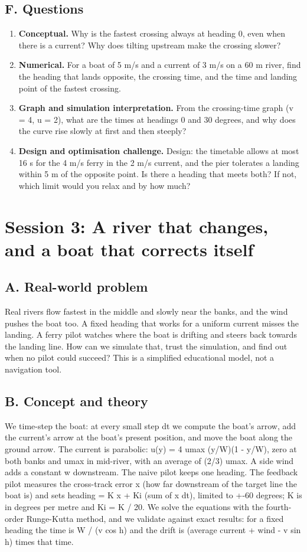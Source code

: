 \documentclass[11pt,a4paper]{article}
\begin{document}
\subsection*{F. Questions}
\begin{enumerate}[nosep]
\item \textbf{Conceptual.} Why is the fastest crossing always at heading 0, even when there is a current? Why does tilting upstream make the crossing slower?
\item \textbf{Numerical.} For a boat of 5 m/s and a current of 3 m/s on a 60 m river, find the heading that lands opposite, the crossing time, and the time and landing point of the fastest crossing.
\item \textbf{Graph and simulation interpretation.} From the crossing-time graph (v = 4, u = 2), what are the times at headings 0 and 30 degrees, and why does the curve rise slowly at first and then steeply?
\item \textbf{Design and optimisation challenge.} Design: the timetable allows at most 16 s for the 4 m/s ferry in the 2 m/s current, and the pier tolerates a landing within 5 m of the opposite point. Is there a heading that meets both? If not, which limit would you relax and by how much?
\end{enumerate}

\section{Session 3: A river that changes, and a boat that corrects itself}

\subsection*{A. Real-world problem}
Real rivers flow fastest in the middle and slowly near the banks, and the wind pushes the boat too. A fixed heading that works for a uniform current misses the landing. A ferry pilot watches where the boat is drifting and steers back towards the landing line. How can we simulate that, trust the simulation, and find out when no pilot could succeed? This is a simplified educational model, not a navigation tool.

\subsection*{B. Concept and theory}
We time-step the boat: at every small step dt we compute the boat's arrow, add the current's arrow at the boat's present position, and move the boat along the ground arrow. The current is parabolic: u(y) = 4 umax (y/W)(1 - y/W), zero at both banks and umax in mid-river, with an average of (2/3) umax. A side wind adds a constant w downstream. The naive pilot keeps one heading. The feedback pilot measures the cross-track error x (how far downstream of the target line the boat is) and sets heading = K x + Ki (sum of x dt), limited to +-60 degrees; K is in degrees per metre and Ki = K / 20. We solve the equations with the fourth-order Runge-Kutta method, and we validate against exact results: for a fixed heading the time is W / (v cos h) and the drift is (average current + wind - v sin h) times that time.
\end{document}
